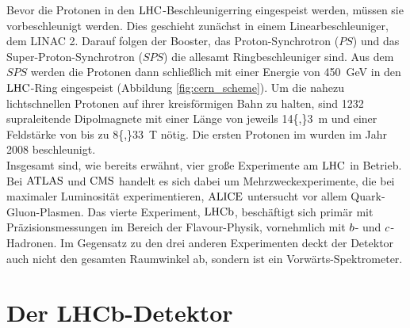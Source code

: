 Bevor die Protonen in den $\mbox{LHC}$-Beschleunigerring eingespeist werden, müssen sie vorbeschleunigt werden. Dies geschieht zunächst in einem Linearbeschleuniger, dem LINAC 2. Darauf folgen der Booster, das Proton-Synchrotron ($P\!S$) und das Super-Proton-Synchrotron ($S\!P\!S$) die allesamt Ringbeschleuniger sind. Aus dem $S\!P\!S$ werden die Protonen dann schließlich mit einer Energie von \SI{450}{GeV} \cite{lhc_design} in den $\mbox{LHC}$-Ring eingespeist (Abbildung \ref{fig:cern_scheme}). Um die nahezu lichtschnellen Protonen auf ihrer kreisförmigen Bahn zu halten, sind  \num{1232}  supraleitende Dipolmagnete mit einer Länge von jeweils \SI{14{,}3}{m} und einer Feldstärke von bis zu \SI{8{,}33}{T} nötig. Die ersten Protonen im \lhc wurden im Jahr \num{2008} beschleunigt.\\
Insgesamt sind, wie bereits erwähnt, vier große Experimente am $\mbox{LHC}$ in Betrieb. Bei $\mbox{ATLAS}$ und $\mbox{CMS}$ handelt es sich dabei um Mehrzweckexperimente, die bei maximaler Luminosität experimentieren, $\mbox{ALICE}$ untersucht vor allem Quark-Gluon-Plasmen. Das vierte Experiment, $\mbox{LHCb}$, beschäftigt sich primär mit Präzisionsmessungen im Bereich der Flavour-Physik, vornehmlich mit ${b}$- und ${c}$-Hadronen. Im Gegensatz zu den drei anderen Experimenten deckt der Detektor auch nicht den gesamten Raumwinkel ab, sondern ist ein Vorwärts-Spektrometer.

\section{Der LHCb-Detektor}

